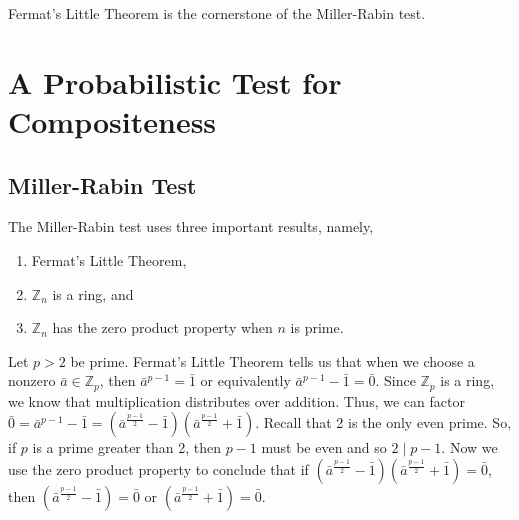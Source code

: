 \documentclass[10pt, titlepage]{amsart}
\newcommand\Z{{\mathbb Z}}
\newtheorem{cor}{Corollary}[subsection]
\theoremstyle{definition}
\newtheorem{definition}{Definition}[subsection]
\begin{document}
	\noindent Fermat's Little Theorem is the cornerstone of the Miller-Rabin test.
		
	
	\section{A Probabilistic Test for Compositeness}\label{section:tests}
	
%	
%	
	
	\subsection{Miller-Rabin Test}
	
	The Miller-Rabin test uses three important results, namely,
	\begin{enumerate}
		\item Fermat's Little Theorem,
		\item $\Z_n$ is a ring, and
		\item $\Z_n$ has the zero product property when $n$ is prime.
	\end{enumerate}
	
	Let $p > 2$ be prime. Fermat's Little Theorem tells us that when we choose a nonzero $\bar{a} \in \Z_p$, then $\bar{a}^{p-1} = \bar{1}$ or equivalently $\bar{a}^{p-1} - \bar{1} = \bar{0}$.
	Since $\Z_p$ is a ring, we know that multiplication distributes over addition.
	Thus, we can factor $\bar{0} = \bar{a}^{p-1} - \bar{1} = (\bar{a}^{\frac{p-1}{2}} - \bar{1})(\bar{a}^{\frac{p-1}{2}} + \bar{1})$.
	Recall that 2 is the only even prime. 
	So, if $p$ is a prime greater than 2, then $p-1$ must be even and so $2 \mid p-1$.
	Now we use the zero product property to conclude that if $(\bar{a}^{\frac{p-1}{2}} - \bar{1})(\bar{a}^{\frac{p-1}{2}} + \bar{1}) = \bar{0}$, then $(\bar{a}^{\frac{p-1}{2}} - \bar{1}) = \bar{0}$ or $(\bar{a}^{\frac{p-1}{2}} + \bar{1}) = \bar{0}$.
	
\end{document}

